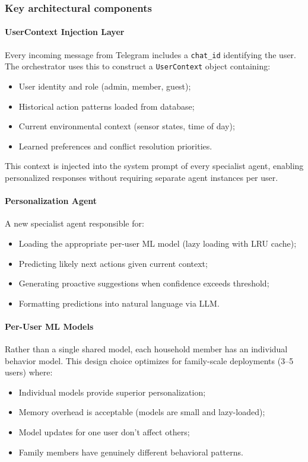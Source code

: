 \subsubsection{Key architectural components}

\paragraph{UserContext Injection Layer}
Every incoming message from Telegram includes a \texttt{chat\_id}
identifying the user. The orchestrator uses this to construct a
\texttt{UserContext} object containing:
\begin{itemize}
    \item User identity and role (admin, member, guest);
    \item Historical action patterns loaded from database;
    \item Current environmental context (sensor states, time of day);
    \item Learned preferences and conflict resolution priorities.
\end{itemize}

This context is injected into the system prompt of every specialist agent,
enabling personalized responses without requiring separate agent instances
per user.

\paragraph{Personalization Agent}
A new specialist agent responsible for:
\begin{itemize}
    \item Loading the appropriate per-user ML model (lazy loading with LRU cache);
    \item Predicting likely next actions given current context;
    \item Generating proactive suggestions when confidence exceeds threshold;
    \item Formatting predictions into natural language via LLM.
\end{itemize}

\paragraph{Per-User ML Models}
Rather than a single shared model, each household member has an individual
behavior model. This design choice optimizes for family-scale deployments
(3--5 users) where:
\begin{itemize}
    \item Individual models provide superior personalization;
    \item Memory overhead is acceptable (models are small and lazy-loaded);
    \item Model updates for one user don't affect others;
    \item Family members have genuinely different behavioral patterns.
\end{itemize}

